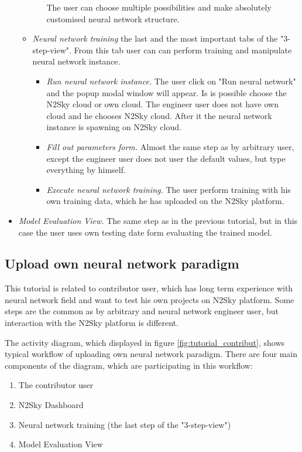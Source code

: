 \begin{itemize}
\begin{itemize}
\begin{itemize}
The user can choose multiple possibilities and make absolutely customised neural network structure.

\end{itemize}
\item \emph{Neural network training} the last and the most important tabs of the "3-step-view". From this tab user can can perform training and manipulate neural network instance.
\begin{itemize}
\item \emph{Run neural network instance.} The user click on "Run neural network" and the popup modal window will appear. Is is possible choose the N2Sky cloud or own cloud. The engineer user does not have own cloud and he chooses N2Sky cloud. After it the neural network instance is spawning on N2Sky cloud.
\item \emph{Fill out parameters form.} Almost the same step as by arbitrary user, except the engineer user does not user the default values, but type everything by himself.
\item \emph{Execute neural network training.} The user perform training with his own training data, which he has uploaded on the N2Sky platform.
\end{itemize}
\end{itemize}
 \item \emph{Model Evaluation View.} The same step as in the previous tutorial, but in this case the user uses own testing date form evaluating the trained model.
\end{itemize}



\subsection{Upload own neural network paradigm}\label{Upload own neural network paradigm}

This tutorial is related to contributor user, which has long term experience with neural network field and want to test his own projects on N2Sky platform.
Some steps are the common as by arbitrary and neural network engineer user, but interaction with the N2Sky platform is different.


The activity diagram, which displayed in figure \ref{fig:tutorial_contribut}, shows typical workflow of uploading own neural network paradigm. There are four main components of the diagram, which are participating in this workflow: 
\begin{enumerate}
\item The contributor user
\item N2Sky Dashboard
\item Neural network training (the last step of the "3-step-view")
\item Model Evaluation View
\end{enumerate}

